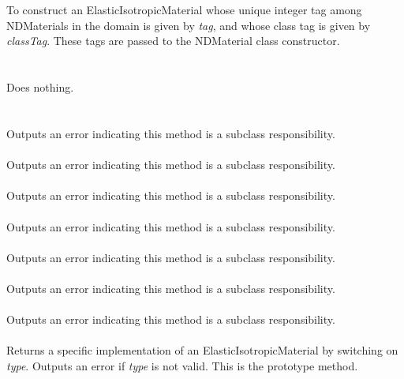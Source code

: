   \\
  \\
To construct an ElasticIsotropicMaterial whose unique integer tag
among NDMaterials in the domain is given by {\em tag}, and whose class
tag is given by {\em classTag}.  These tags are passed to the
NDMaterial class constructor. \\

 \\
 \\
Does nothing. \\ 

 \\
  \\
Outputs an error indicating this method is a subclass responsibility. \\

 \\
Outputs an error indicating this method is a subclass responsibility. \\

 \\
Outputs an error indicating this method is a subclass responsibility. \\

 \\
Outputs an error indicating this method is a subclass responsibility. \\

 \\
Outputs an error indicating this method is a subclass responsibility. \\

 \\
Outputs an error indicating this method is a subclass responsibility. \\

 \\
Outputs an error indicating this method is a subclass responsibility. \\

 \\
Returns a specific implementation of an ElasticIsotropicMaterial by
switching on {\em type}.  Outputs an error if {\em type} is not valid.
This is the prototype method.